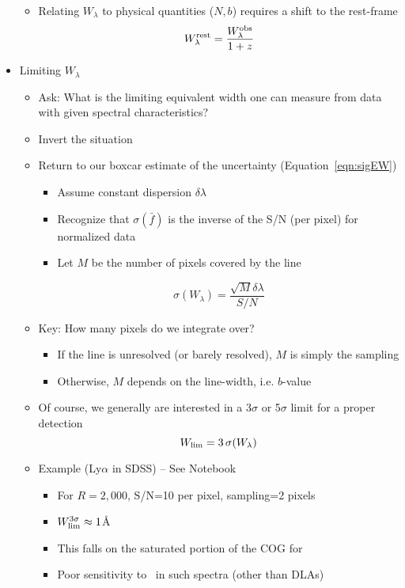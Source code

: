 \documentclass[12pt,letterpaper]{article}
\begin{document}
\begin{Aenumerate}
\begin{itemize}
\begin{itemize}
		\item Relating $W_\lambda$ to physical quantities ($N,b$) 
		requires a shift to the rest-frame
		\begin{equation}
		W_\lambda^{\rm rest} = \frac{W_\lambda^{\rm obs}}{1+z}
		\end{equation}
		\end{itemize}
	\item Limiting $W_\lambda$
		\begin{itemize}
		\item Ask: What is the limiting equivalent width one can measure from
		data with given spectral characteristics?
		\item Invert the situation
		\item Return to our boxcar estimate of the uncertainty 
		(Equation~\ref{eqn:sigEW})
			\begin{itemize}
			\item Assume constant dispersion $\delta\lambda$
			\item Recognize that $\sigma(\bar f)$ is the inverse of
			the S/N (per pixel) for normalized data
			\item Let $M$ be the number of pixels covered by the line
			\end{itemize}
		\begin{equation}
		\sigma(W_\lambda) = \frac{\sqrt{M} \delta\lambda}{S/N}
		\end{equation}
		\item Key: How many pixels do we integrate over?
			\begin{itemize}
			\item If the line is unresolved (or barely resolved), 
			$M$ is simply the sampling
			\item Otherwise, $M$ depends on the line-width, i.e. $b$-value
			\end{itemize}
		\item Of course, we generally are interested in a 3$\sigma$
		or 5$\sigma$ limit for a proper detection
		\begin{equation}
		W_{\rm lim}  = 3 \, \sigma(W_\lambda)
		\end{equation}
		\item Example (Ly$\alpha$ in SDSS) -- See Notebook
			\begin{itemize}
			\item For $R=2,000$, S/N=10 per pixel, sampling=2 pixels
			\item $W_{\rm lim}^{3\sigma} \approx 1$\AA
			\item This falls on the saturated portion of the COG for \lya
			\item Poor sensitivity to \nhi\ in such spectra (other than DLAs)
			\end{itemize}
		\end{itemize}
	\end{itemize}


\end{Aenumerate}
\end{document}
